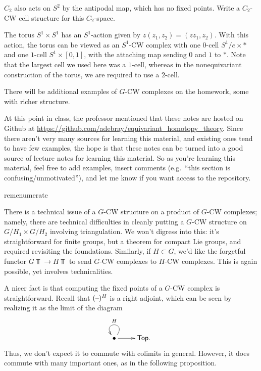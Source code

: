 \begin{ex}
$C_2$ also acts on $S^2$ by the antipodal map, which has no fixed points. Write a $C_2$-CW cell structure for this
$C_2$-space.
\end{ex}

\begin{exm}
The torus $S^1 \times S^1$ has an $S^1$-action given by $z(z_1, z_2) = (zz_1, z_2)$. With this action, the torus
can be viewed as an $S^1$-CW complex with one $0$-cell $S^1/e \times *$ and one $1$-cell $S^1 \times [0,1]$, with
the attaching map sending $0$ and $1$ to $*$. Note that the largest cell we used here was a $1$-cell, whereas in
the nonequivariant construction of the torus, we are required to use a $2$-cell.
\end{exm}
There will be additional examples of $G$-CW complexes on the homework, some with richer structure.
\begin{rem}
At this point in class, the professor mentioned that these notes are hosted on Github at
\url{https://github.com/adebray/equivariant_homotopy_theory}. Since there aren't very many sources for learning
this material, and existing ones tend to have few examples, the hope is that these notes can be turned into a good
source of lecture notes for learning this material. So as you're learning this material, feel free to add
examples, insert comments (e.g.\ ``this section is confusing/unmotivated''), and let me know if you want access to
the repository.
\end{rem}
\begin{comp}{rem}{enumerate}
	\item There is a technical issue of a $G$-CW structure on a product of $G$-CW complexes; namely, there are
	technical difficulties in cleanly putting a $G$-CW structure on $G/H_1\times G/H_2$ involving triangulation.
	We won't digress into this: it's straightforward for finite groups, but a theorem for compact Lie groups, and
	required revisiting the foundations. Similarly, if $H\subset G$, we'd like the forgetful functor $G\Top\to
	H\Top$ to send $G$-CW complexes to $H$-CW complexes. This is again possible, yet involves technicalities.
	\item A nicer fact is that computing the fixed points of a $G$-CW complex is straightforward. Recall that
	$(\text{--})^H$ is a right adjoint, which can be seen by realizing it as the limit of the diagram
	\[\xymatrix{
		\bullet\ar@(ur, ul)_H\ar[r] & \Top.
	}\]
	Thus, we don't expect it to commute with colimits in general. However, it does commute with many important
	ones, as in the following proposition.\qedhere
\end{comp}
